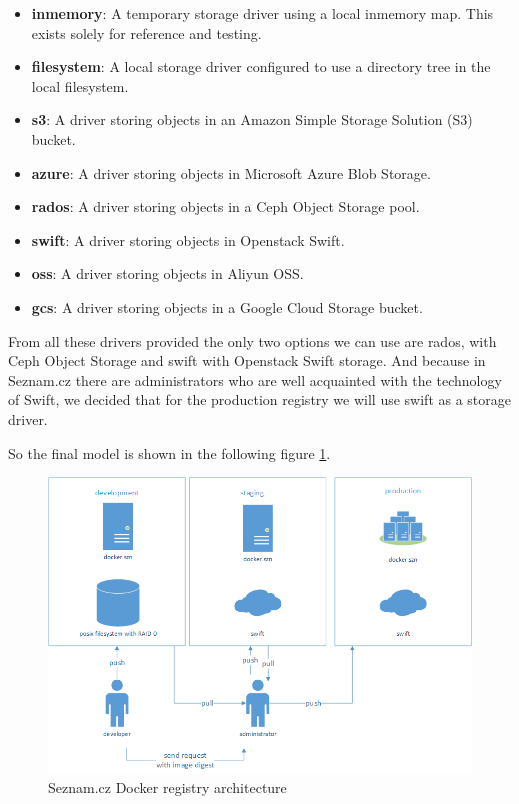 \begin{itemize}
  \item \textbf{inmemory}: A temporary storage driver using a local inmemory map. This exists solely for reference and testing.
  \item \textbf{filesystem}: A local storage driver configured to use a directory tree in the local filesystem.
  \item \textbf{s3}: A driver storing objects in an Amazon Simple Storage Solution (S3) bucket.
  \item \textbf{azure}: A driver storing objects in Microsoft Azure Blob Storage.
  \item \textbf{rados}: A driver storing objects in a Ceph Object Storage pool.
  \item \textbf{swift}: A driver storing objects in Openstack Swift.
  \item \textbf{oss}: A driver storing objects in Aliyun OSS.
  \item \textbf{gcs}: A driver storing objects in a Google Cloud Storage bucket.
\end{itemize}


From all these drivers provided the only two options we can use are rados, with Ceph Object Storage and swift with Openstack Swift storage. And because in Seznam.cz there are administrators who are well acquainted with the technology of Swift, we decided that for the production registry we will use swift as a storage driver.

So the final model is shown in the following figure \ref{fig:seznam-docker-registry}.
                
\begin{figure}[htb]\centering
  \includegraphics[width=1\textwidth]{images/registry.png}
  \caption
    {Seznam.cz Docker registry architecture}
  \label{fig:seznam-docker-registry}
\end{figure}
